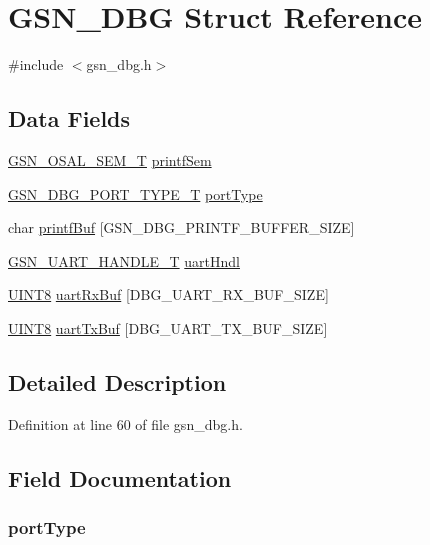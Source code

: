 \hypertarget{a00042}{
\section{GSN\_\-DBG Struct Reference}
\label{a00042}
}


{\ttfamily \#include $<$gsn\_\-dbg.h$>$}

\subsection*{Data Fields}
\begin{DoxyCompactItemize}
\item 
\hyperlink{a00628_gab4b3554407ce22b940e2fcd3faf5fd47}{GSN\_\-OSAL\_\-SEM\_\-T} \hyperlink{a00042_a6ecc33e0b8c5c76e6e5506aa5b12f527}{printfSem}
\item 
\hyperlink{a00480_a42632950cffc518e7b58d4661584b8a9}{GSN\_\-DBG\_\-PORT\_\-TYPE\_\-T} \hyperlink{a00042_a70766d09a689bb5a3144a937291210fb}{portType}
\item 
char \hyperlink{a00042_a5ac37032264aab467131d22bf7f6da1f}{printfBuf} \mbox{[}GSN\_\-DBG\_\-PRINTF\_\-BUFFER\_\-SIZE\mbox{]}
\item 
\hyperlink{a00266}{GSN\_\-UART\_\-HANDLE\_\-T} \hyperlink{a00042_a7b9cba8523e2516fd8f1d61bf8fe72cf}{uartHndl}
\item 
\hyperlink{a00660_gab27e9918b538ce9d8ca692479b375b6a}{UINT8} \hyperlink{a00042_af14e7b30aac2fa083e94f08dd133640a}{uartRxBuf} \mbox{[}DBG\_\-UART\_\-RX\_\-BUF\_\-SIZE\mbox{]}
\item 
\hyperlink{a00660_gab27e9918b538ce9d8ca692479b375b6a}{UINT8} \hyperlink{a00042_ac0b6a8b78963ea17376effd95a0014b4}{uartTxBuf} \mbox{[}DBG\_\-UART\_\-TX\_\-BUF\_\-SIZE\mbox{]}
\end{DoxyCompactItemize}


\subsection{Detailed Description}


Definition at line 60 of file gsn\_\-dbg.h.



\subsection{Field Documentation}
\hypertarget{a00042_a70766d09a689bb5a3144a937291210fb}{
\subsubsection[{portType}]{ {\bf portType}}}
\label{a00042_a70766d09a689bb5a3144a937291210fb}


